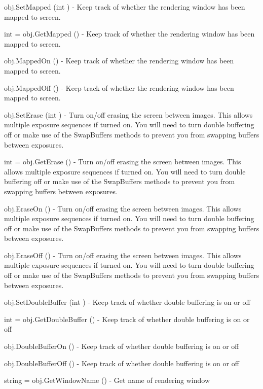 \begin{DoxyItemize}
\item {\ttfamily obj.\-Set\-Mapped (int )} -\/ Keep track of whether the rendering window has been mapped to screen.  
\item {\ttfamily int = obj.\-Get\-Mapped ()} -\/ Keep track of whether the rendering window has been mapped to screen.  
\item {\ttfamily obj.\-Mapped\-On ()} -\/ Keep track of whether the rendering window has been mapped to screen.  
\item {\ttfamily obj.\-Mapped\-Off ()} -\/ Keep track of whether the rendering window has been mapped to screen.  
\item {\ttfamily obj.\-Set\-Erase (int )} -\/ Turn on/off erasing the screen between images. This allows multiple exposure sequences if turned on. You will need to turn double buffering off or make use of the Swap\-Buffers methods to prevent you from swapping buffers between exposures.  
\item {\ttfamily int = obj.\-Get\-Erase ()} -\/ Turn on/off erasing the screen between images. This allows multiple exposure sequences if turned on. You will need to turn double buffering off or make use of the Swap\-Buffers methods to prevent you from swapping buffers between exposures.  
\item {\ttfamily obj.\-Erase\-On ()} -\/ Turn on/off erasing the screen between images. This allows multiple exposure sequences if turned on. You will need to turn double buffering off or make use of the Swap\-Buffers methods to prevent you from swapping buffers between exposures.  
\item {\ttfamily obj.\-Erase\-Off ()} -\/ Turn on/off erasing the screen between images. This allows multiple exposure sequences if turned on. You will need to turn double buffering off or make use of the Swap\-Buffers methods to prevent you from swapping buffers between exposures.  
\item {\ttfamily obj.\-Set\-Double\-Buffer (int )} -\/ Keep track of whether double buffering is on or off  
\item {\ttfamily int = obj.\-Get\-Double\-Buffer ()} -\/ Keep track of whether double buffering is on or off  
\item {\ttfamily obj.\-Double\-Buffer\-On ()} -\/ Keep track of whether double buffering is on or off  
\item {\ttfamily obj.\-Double\-Buffer\-Off ()} -\/ Keep track of whether double buffering is on or off  
\item {\ttfamily string = obj.\-Get\-Window\-Name ()} -\/ Get name of rendering window  

\end{DoxyItemize}
